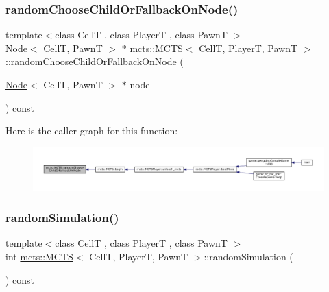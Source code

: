 \subsubsection{\texorpdfstring{random\+Choose\+Child\+Or\+Fallback\+On\+Node()}{randomChooseChildOrFallbackOnNode()}}
{\footnotesize\ttfamily template$<$class CellT , class PlayerT , class PawnT $>$ \\
\hyperlink{structmcts_1_1_node}{Node}$<$ CellT, PawnT $>$ $\ast$ \hyperlink{classmcts_1_1_m_c_t_s}{mcts\+::\+M\+C\+TS}$<$ CellT, PlayerT, PawnT $>$\+::random\+Choose\+Child\+Or\+Fallback\+On\+Node (\begin{DoxyParamCaption}\item[{\hyperlink{structmcts_1_1_node}{Node}$<$ CellT, PawnT $>$ $\ast$}]{node }\end{DoxyParamCaption}) const\hspace{0.3cm}{\ttfamily [protected]}}

Here is the caller graph for this function\+:
\nopagebreak
\begin{figure}[H]
\begin{center}
\leavevmode
\includegraphics[width=350pt]{classmcts_1_1_m_c_t_s_a6b5686f91610bb4f46c395634a17a5b8_icgraph}
\end{center}
\end{figure}
\mbox{\label{classmcts_1_1_m_c_t_s_ad465558c1f4933cae2a32ff7394fc49b}} 
\subsubsection{\texorpdfstring{random\+Simulation()}{randomSimulation()}}
{\footnotesize\ttfamily template$<$class CellT , class PlayerT , class PawnT $>$ \\
int \hyperlink{classmcts_1_1_m_c_t_s}{mcts\+::\+M\+C\+TS}$<$ CellT, PlayerT, PawnT $>$\+::random\+Simulation (\begin{DoxyParamCaption}{ }\end{DoxyParamCaption}) const\hspace{0.3cm}{\ttfamily [protected]}}

